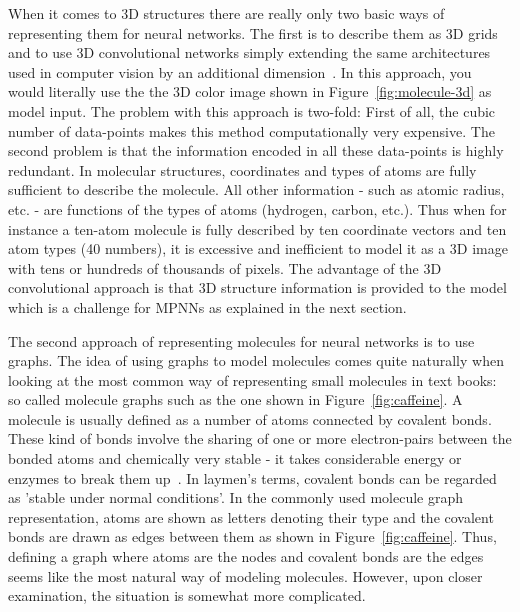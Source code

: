 When it comes to 3D structures there are really only two basic ways of representing them for neural networks. The first is to describe them as 3D grids and to use 3D convolutional networks simply extending the same architectures used in computer vision by an additional dimension~\cite{Wallach2015}. In this approach, you would literally use the the 3D color image shown in Figure~\ref{fig:molecule-3d} as model input. The problem with this approach is two-fold: First of all, the cubic number of data-points makes this method computationally very expensive. The second problem is that the information encoded in all these data-points is highly redundant. In molecular structures, coordinates and types of atoms are fully sufficient to describe the molecule. All other information - such as atomic radius, etc. - are functions of the types of atoms (hydrogen, carbon, etc.). Thus when for instance a ten-atom molecule is fully described by ten coordinate vectors and ten atom types (40 numbers), it is excessive and inefficient to model it as a 3D image with tens or hundreds of thousands of pixels. The advantage of the 3D convolutional approach is that 3D structure information is provided to the model which is a challenge for MPNNs as explained in the next section.


The second approach of representing molecules for neural networks is to use graphs. The idea of using graphs to model molecules comes quite naturally when looking at the most common way of representing small molecules in text books: so called molecule graphs such as the one shown in Figure~\ref{fig:caffeine}. A molecule is usually defined as a number of atoms connected by covalent bonds. These kind of bonds involve the sharing of one or more electron-pairs between the bonded atoms and chemically very stable - it takes considerable energy or enzymes to break them up~\cite{Organic-chemistry}. In laymen's terms, covalent bonds can be regarded as 'stable under normal conditions'. In the commonly used molecule graph representation, atoms are shown as letters denoting their type and the covalent bonds are drawn as edges between them as shown in Figure~\ref{fig:caffeine}. Thus, defining a graph where atoms are the nodes and covalent bonds are the edges seems like the most natural way of modeling molecules. However, upon closer examination, the situation is somewhat more complicated.


